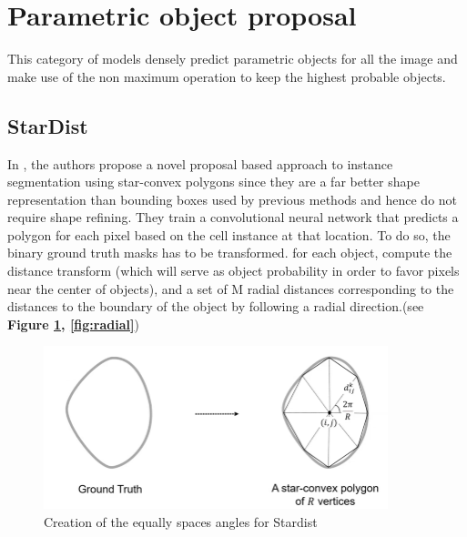 \documentclass[main.tex]{subfiles}
\begin{document}
\section{Parametric object proposal}
This category of models densely predict parametric objects for all the image and make use of the non maximum operation to keep the highest probable objects. 

\subsection{StarDist}
In \cite{Schmidt2018}, the authors propose a novel proposal based approach to instance segmentation using star-convex polygons since they are a far better shape representation than bounding boxes used by previous methods and hence do not require shape refining. They train a convolutional neural network that predicts a polygon for each pixel based on the cell instance at that location. To do so, the binary ground truth masks has to be transformed. for each object, compute the distance transform (which will serve as object probability in order to favor pixels near the center of objects), and a set of M radial distances corresponding to the distances to the boundary of the object by following a radial direction.(see \textbf{Figure \ref{fig:stardistangles}, \ref{fig:radial}}) 

\begin{figure}[H]
    \centering
    \includegraphics[width=10cm]{images/stardistCreateAnnot.PNG}
    \caption{Creation of the equally spaces angles for Stardist}
    \label{fig:stardistangles}
\end{figure}
\end{document}
